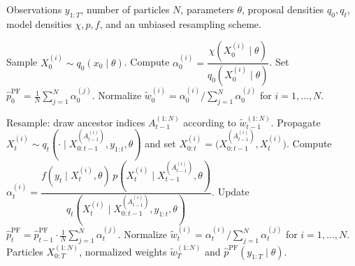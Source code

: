 \begin{algorithm}
\caption{Sequential importance sampling with resampling (particle filter)}
\label{alg:sisr}
\begin{algorithmic}[1]
    \REQUIRE Observations $y_{1:T}$, number of particles $N$, parameters $\theta$, proposal densities $q_0,q_t$, model densities $\chi,p,f$, and an unbiased resampling scheme.

        \STATE Sample $X_0^{(i)} \sim q_0(x_0 \mid \theta)$.
        \STATE Compute $\alpha_0^{(i)} = \dfrac{\chi(X_0^{(i)}\mid \theta)}{q_0(X_0^{(i)} \mid \theta)}$.
    \ENDFOR
    \STATE Set $\hat{p}^{\mathrm{PF}}_0 = \frac{1}{N}\sum_{j=1}^{N}\alpha_0^{(j)}$.
    \STATE Normalize $\tilde{w}_0^{(i)} = \alpha_0^{(i)} / \sum_{j=1}^{N} \alpha_0^{(j)}$ for $i=1,\ldots,N$.

        \STATE Resample: draw ancestor indices $A_{t-1}^{(1:N)}$ according to $\tilde{w}_{t-1}^{(1:N)}$.
            \STATE Propagate $X_t^{(i)} \sim q_t(\cdot\mid X_{0:t-1}^{(A_{t-1}^{(i)})},y_{1:t},\theta)$ and set $X_{0:t}^{(i)} = \big(X_{0:t-1}^{(A_{t-1}^{(i)})}, X_t^{(i)}\big)$.
            \STATE Compute $\alpha_t^{(i)} = \dfrac{f(y_t\mid X_t^{(i)}, \theta)\,p(X_t^{(i)}\mid X_{t-1}^{(A_{t-1}^{(i)})}, \theta)}{q_t(X_t^{(i)}\mid X_{0:t-1}^{(A_{t-1}^{(i)})},y_{1:t}, \theta)}$.
        \ENDFOR
        \STATE Update $\hat{p}^{\mathrm{PF}}_t = \hat{p}^{\mathrm{PF}}_{t-1}\cdot\frac{1}{N}\sum_{j=1}^{N} \alpha_t^{(j)}$.
        \STATE Normalize $\tilde{w}_t^{(i)} = \alpha_t^{(i)} / \sum_{j=1}^{N} \alpha_t^{(j)}$ for $i=1,\ldots,N$.
    \ENDFOR
    \RETURN Particles $X_{0:T}^{(1:N)}$, normalized weights $\tilde{w}_T^{(1:N)}$ and $\hat{p}^{\mathrm{PF}}(y_{1:T}\mid\theta)$.
\end{algorithmic}
\end{algorithm}

